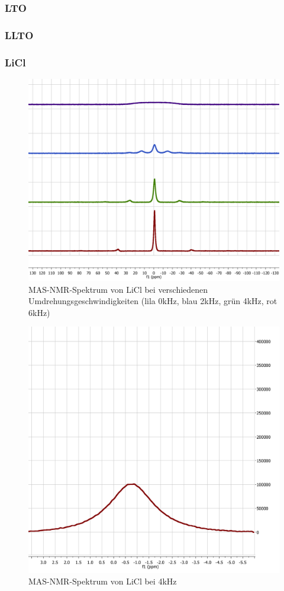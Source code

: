 \documentclass[a4paper, 11pt, headsepline,footsepline,twoside,abstract]{scrbook}
\begin{document}
\subsubsection{LTO}
\subsubsection{LLTO}
\subsubsection{LiCl}
\begin{figure}
	\centering
	\includegraphics[width=1.0\columnwidth]{images/Spektrum_LiCl.png}
	\caption{MAS-NMR-Spektrum von LiCl bei verschiedenen Umdrehungsgeschwindigkeiten (lila 0kHz, blau 2kHz, grün 4kHz, rot 6kHz)}
	\label{nmr_mas_LiCl}
\end{figure}
\begin{figure}
	\centering
	\includegraphics[width=1.0\columnwidth]{images/LiCl.png}
	\caption{MAS-NMR-Spektrum von LiCl bei 4kHz}
	\label{nmr_mas_LATP2}
\end{figure}
\end{document}
